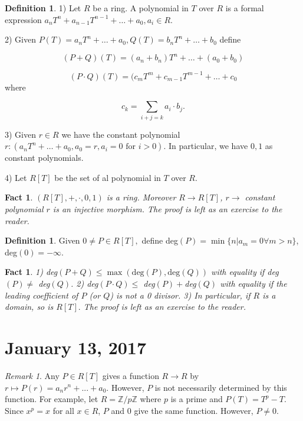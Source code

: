 \documentclass{amsart}
\newcommand{\ZZ}{\mathbb{Z}}
\newtheorem{fact}[thm]{Fact}
\theoremstyle{definition}
\newtheorem{defn}[thm]{Definition}
\theoremstyle{remark}
\newtheorem*{rmk}{Remark}
\begin{document}
\begin{defn}

1) Let $R$ be a ring. A polynomial in $T$ over $R$ is a formal expression $a_nT^n+a_{n-1}T^{n-1}+\ldots+a_0,a_i\in R.$

2) Given $P(T)=a_nT^n+\ldots+a_0,Q(T)=b_nT^n+\ldots+b_0$ define

$$(P+Q)(T)=(a_n+b_n)T^n+\ldots+(a_0+b_0)$$

$$(P\cdot Q)(T)=(c_mT^m+c_{m-1}T^{m-1}+\ldots+c_0$$ where

$$c_k=\sum_{i+j=k}a_i\cdot b_j.$$

3) Given $r\in R$ we have the constant polynomial
$r:(a_nT^n+\ldots+a_0,a_0=r,a_i=0\text{ for } i>0).$ In particular, we have $0,1$ as constant polynomials.

4) Let $R[T]$ be the set of al polynomial in $T$ over $R$.

\begin{fact} $(R[T],+,\cdot,0,1)$ is a ring. Moreover $R\rightarrow R[T]$, $r\rightarrow$ constant polynomial $r$ is an injective morphism. The proof is left as an exercise to the reader.
\end{fact}

\end{defn}

\begin{defn}

Given $0\ne P\in R[T],$ define deg$(P)=\min\{n|a_m=0\forall m>n\}$, deg$(0)=-\infty$.
\end{defn}
\begin{fact}\label{polyringdomain}
1) deg$(P+Q)\leq\max(\text{deg}(P),\text{deg}(Q))$ with equality if deg$(P)\ne$ deg$(Q)$.
2) deg$(P\cdot Q)\leq$ deg$(P)+$deg$(Q)$ with equality if the leading coefficient of $P$ (or $Q$) is not a 0 divisor.
3) In particular, if $R$ is a domain, so is $R[T].$ The proof is left as an exercise to the reader.
\end{fact}

\section{January 13, 2017} %

\begin{rmk}
Any $P \in R[T]$ gives a function $R \rightarrow R$ by $r \mapsto P(r) = a_nr^n + ... + a_0$.  However, $P$ is not necessarily determined by this function.  For example, let $R = \ZZ / p\ZZ$ where $p$ is a prime and $P(T) = T^p - T$.  Since $x^p = x$ for all $x \in R$, $P$ and $0$ give the same function.  However, $P \neq 0$.
\end{rmk}
\end{document}
